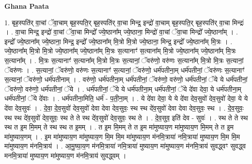 \documentclass[17pt]{extarticle}
\begin{document}
\textbf{Ghana Paata } \newline

1. बृह॒स्पति॑र् वा॒चां ॅवा॒चाम् बृह॒स्पति॒र् बृह॒स्पति॑र् वा॒चा मिन्द्र॒ इन्द्रो॑ वा॒चाम् बृह॒स्पति॒र् बृह॒स्पति॑र् 
वा॒चा मिन्द्रः॑ । . वा॒चा मिन्द्र॒ इन्द्रो॑ वा॒चां ॅवा॒चा मिन्द्रो᳚ ज्ये॒ष्ठाना᳚म् ज्ये॒ष्ठाना॒ मिन्द्रो॑ वा॒चां ॅवा॒चा मिन्द्रो᳚ ज्ये॒ष्ठाना᳚म् । . इन्द्रो᳚ ज्ये॒ष्ठाना᳚म् ज्ये॒ष्ठाना॒ मिन्द्र॒ इन्द्रो᳚ ज्ये॒ष्ठाना᳚म् मि॒त्रो मि॒त्रो ज्ये॒ष्ठाना॒ मिन्द्र॒ इन्द्रो᳚ ज्ये॒ष्ठाना᳚म् मि॒त्रः । . ज्ये॒ष्ठाना᳚म् मि॒त्रो मि॒त्रो ज्ये॒ष्ठाना᳚म् ज्ये॒ष्ठाना᳚म् मि॒त्रः स॒त्यानाꣳ॑ स॒त्याना᳚म् मि॒त्रो ज्ये॒ष्ठाना᳚म् ज्ये॒ष्ठाना᳚म् मि॒त्रः स॒त्याना᳚म् । . मि॒त्रः स॒त्यानाꣳ॑ स॒त्याना᳚म् मि॒त्रो मि॒त्रः स॒त्यानां॒ ॅवरु॑णो॒ वरु॑णः स॒त्याना᳚म् मि॒त्रो मि॒त्रः स॒त्यानां॒ ॅवरु॑णः । . स॒त्यानां॒ ॅवरु॑णो॒ वरु॑णः स॒त्यानाꣳ॑ स॒त्यानां॒ ॅवरु॑णो॒ धर्म॑पतीना॒म् धर्म॑पतीनां॒ ॅवरु॑णः स॒त्यानाꣳ॑ स॒त्यानां॒ ॅवरु॑णो॒ धर्म॑पतीनाम् । . वरु॑णो॒ धर्म॑पतीना॒म् धर्म॑पतीनां॒ ॅवरु॑णो॒ वरु॑णो॒ धर्म॑पतीनां॒ ॅये ये धर्म॑पतीनां॒ ॅवरु॑णो॒ वरु॑णो॒ धर्म॑पतीनां॒ ॅये । . धर्म॑पतीनां॒ ॅये ये धर्म॑पतीना॒म् धर्म॑पतीनां॒ ॅये दे॑वा देवा॒ ये धर्म॑पतीना॒म् धर्म॑पतीनां॒ ॅये दे॑वाः । . धर्म॑पतीना॒मिति॒ धर्म॑ - प॒ती॒ना॒म् । . ये दे॑वा देवा॒ ये ये दे॑वा देव॒सुवो॑ देव॒सुवो॑ देवा॒ ये ये दे॑वा देव॒सुवः॑ । . दे॒वा॒ दे॒व॒सुवो॑ देव॒सुवो॑ देवा देवा देव॒सुवः॒ स्थ स्थ दे॑व॒सुवो॑ देवा देवा देव॒सुवः॒ स्थ । . दे॒व॒सुवः॒ स्थ स्थ दे॑व॒सुवो॑ देव॒सुवः॒ स्थ ते ते स्थ दे॑व॒सुवो॑ देव॒सुवः॒ स्थ ते । . दे॒व॒सुव॒ इति॑ देव - सुवः॑ । . स्थ ते ते स्थ स्थ त इ॒म मि॒मम् ते स्थ स्थ त इ॒मम् । . त इ॒म मि॒मम् ते त इ॒म मा॑मुष्याय॒ण मा॑मुष्याय॒ण मि॒मम् ते त इ॒म मा॑मुष्याय॒णम् । . इ॒म मा॑मुष्याय॒ण मा॑मुष्याय॒ण मि॒म मि॒म मा॑मुष्याय॒ण म॑नमि॒त्राया॑ नमि॒त्राया॑ मुष्याय॒ण मि॒म मि॒म मा॑मुष्याय॒ण म॑नमि॒त्राय॑ । . आ॒मु॒ष्या॒य॒ण म॑नमि॒त्राया॑ नमि॒त्राया॑ मुष्याय॒ण मा॑मुष्याय॒ण म॑नमि॒त्राय॑ सुवद्ध्वꣳ सुवद्ध्व मनमि॒त्राया॑ मुष्याय॒ण मा॑मुष्याय॒ण म॑नमि॒त्राय॑ सुवद्ध्वम् । \newline
\end{document}
